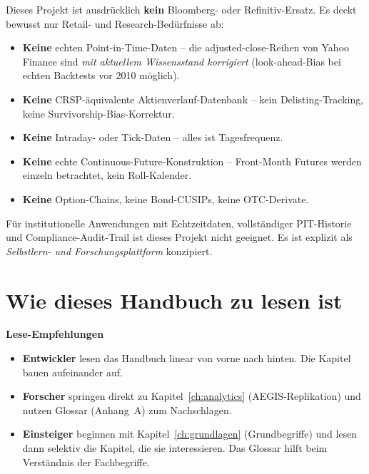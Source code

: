 \begin{warnung}
Dieses Projekt ist ausdrücklich \textbf{kein} Bloomberg- oder
Refinitiv-Ersatz. Es deckt bewusst nur Retail- und Research-Bedürfnisse ab:

\begin{itemize}
  \item \textbf{Keine} echten Point-in-Time-Daten -- die adjusted-close-Reihen
        von Yahoo Finance sind \emph{mit aktuellem Wissensstand korrigiert}
        (look-ahead-Bias bei echten Backtests vor 2010 möglich).
  \item \textbf{Keine} CRSP-äquivalente Aktienverlauf-Datenbank -- kein
        Delisting-Tracking, keine Survivorship-Bias-Korrektur.
  \item \textbf{Keine} Intraday- oder Tick-Daten -- alles ist
        Tagesfrequenz.
  \item \textbf{Keine} echte Continuous-Future-Konstruktion -- Front-Month
        Futures werden einzeln betrachtet, kein Roll-Kalender.
  \item \textbf{Keine} Option-Chains, keine Bond-CUSIPs, keine
        OTC-Derivate.
\end{itemize}
\end{warnung}

Für institutionelle Anwendungen mit Echtzeitdaten, vollständiger
PIT-Historie und Compliance-Audit-Trail ist dieses Projekt nicht
geeignet. Es ist explizit als \emph{Selbstlern- und Forschungsplattform}
konzipiert.

\section{Wie dieses Handbuch zu lesen ist}

\begin{beispiel}
\textbf{Lese-Empfehlungen}
  \begin{itemize}
    \item \textbf{Entwickler} lesen das Handbuch linear von vorne nach
          hinten. Die Kapitel bauen aufeinander auf.
    \item \textbf{Forscher} springen direkt zu Kapitel~\ref{ch:analytics}
          (AEGIS-Replikation) und nutzen Glossar (Anhang~A) zum
          Nachschlagen.
    \item \textbf{Einsteiger} beginnen mit Kapitel~\ref{ch:grundlagen}
          (Grundbegriffe) und lesen dann selektiv die Kapitel, die sie
          interessieren. Das Glossar hilft beim Verständnis der
          Fachbegriffe.
  \end{itemize}
\end{beispiel}

